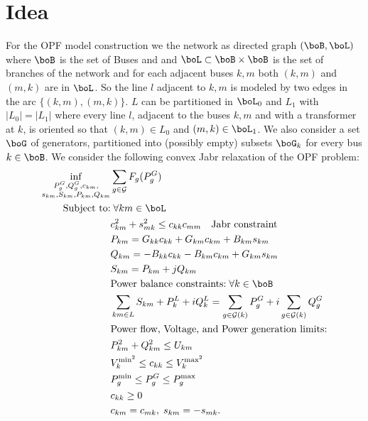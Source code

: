 \documentclass[11pt,a4paper,oneside,openany]{book}
\numberwithin{definition}{section}
\numberwithin{theorem}{section}
\numberwithin{problem}{section}
\begin{document}
\tableofcontents

\newpage




\section{Idea}



For the OPF model construction we the network as directed graph
$(\boB,\boL)$ where $\boB$ is the set of Buses and and $\boL \subset \boB \times \boB$ is the 
set of branches of the network and for each adjacent buses $k,m$ both $(k,m)$ and $(m,k)$ are
in $\boL$. So the line $l$ adjacent to $k,m$ is modeled by two edges in the arc $\{(k,m),(m,k)\}$.
$L$ can be partitioned in $\boL_0$ and $L_1$ with $|L_0|=|L_1|$ where every line $l$, adjacent 
to the buses $k,m$ and with a transformer at $k$, is oriented so that $(k,m) \in L_0$ and 
$(m,k) \in \boL_1$. We also consider a set $\boG$ of generators, partitioned into 
(possibly empty) subsets $\boG_k$ for every bus $k \in \boB$.
We consider the following convex Jabr relaxation of the OPF problem:
\begin{align}
  \label{Jabr equality model}
  \inf_{\substack{P^G_g, Q^G_g, c_{km}, \\ s_{km}, S_{km}, P_{km}, Q_{km}}} & \sum_{g \in \mathcal{G}}{F_g(P_g^G)} \\
  \text{Subject to:} & \; \forall km \in \boL \nonumber \\
  & c_{km}^2 + s_{mk}^2 \leq c_{kk}c_{mm} \quad \text{Jabr constraint} \label{Jabr constraint}\\
  & P_{km} = G_{kk}c_{kk}+G_{km}c_{km}+B_{km}s_{km} \label{c to P} \\
  & Q_{km} = -B_{kk}c_{kk}-B_{km}c_{km}+G_{km}s_{km} \label{c to Q}\\
  & S_{km} = P_{km} + jQ_{km} \label{PQ to S}\\
  & \text{Power balance constraints:}\; \forall k \in \boB\nonumber \\
  & \sum_{km \in L}S_{km}+P_k^L+iQ_k^L = \sum_{g \in \mathcal{G}(k)}{P_g^G} + i\sum_{g \in \mathcal{G}(k)}{Q_g^G} \label{Power Flow Constraint J}\\
  & \text{Power flow, Voltage, and Power generation limits:} \nonumber \\
  & P_{km}^2 + Q_{km}^2 \leq U_{km} \label{Power Flow Magnitude Constraint J}\\
  & V_k^{\text{min}^2} \leq c_{kk} \leq V_k^{\text{max}^2} \label{Voltage Magnitude Constraint J} \\
  & P_g^{\text{min}} \leq P_g^G \leq P_g^{\text{max}}\label{Power generation Magnitude Constraint J} \\
  & c_{kk} \geq 0 \; \\ 
  & c_{km} = c_{mk}, \;s_{km} = - s_{mk}.
  \end{align}
\end{document}
